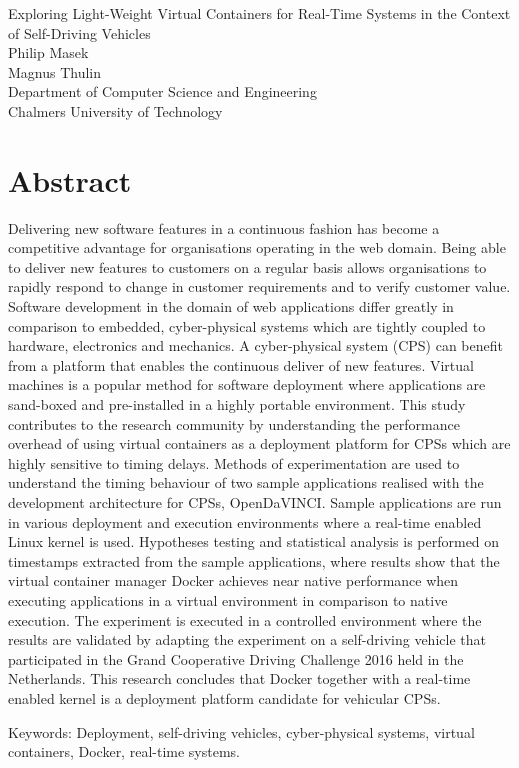 Exploring Light-Weight Virtual Containers for Real-Time Systems in the Context of Self-Driving Vehicles\\
Philip Masek\\
Magnus Thulin\\
Department of Computer Science and Engineering\\
Chalmers University of Technology \setlength{\parskip}{0.5cm}

\thispagestyle{plain}			%
\setlength{\parskip}{0pt plus 1.0pt}
\section*{Abstract}
Delivering new software features in a continuous fashion has become a competitive advantage for organisations operating in the web domain. Being able to deliver new features to customers on a regular basis allows organisations to rapidly respond to change in customer requirements and to verify customer value. Software development in the domain of web applications differ greatly in comparison to embedded, cyber-physical systems which are tightly coupled to hardware, electronics and mechanics. A cyber-physical system (CPS) can benefit from a platform that enables the continuous deliver of new features. Virtual machines is a popular method for software deployment where applications are sand-boxed and pre-installed in a highly portable environment. This study contributes to the research community by understanding the performance overhead of using virtual containers as a deployment platform for CPSs which are highly sensitive to timing delays. Methods of experimentation are used to understand the timing behaviour of two sample applications realised with the development architecture for CPSs, OpenDaVINCI. Sample applications are run in various deployment and execution environments where a real-time enabled Linux kernel is used. Hypotheses testing and statistical analysis is performed on timestamps extracted from the sample applications, where results show that the virtual container manager Docker achieves near native performance when executing applications in a virtual environment in comparison to native execution.  The experiment is executed in a controlled environment where the results are validated by adapting the experiment on a self-driving vehicle that participated in the Grand Cooperative Driving Challenge 2016 held in the Netherlands. This research concludes that Docker together with a real-time enabled kernel is a deployment platform candidate for vehicular CPSs. 





\vfill
Keywords: Deployment, self-driving vehicles, cyber-physical systems, virtual containers, Docker, real-time systems.

\newpage				%
\thispagestyle{empty}
\mbox{}